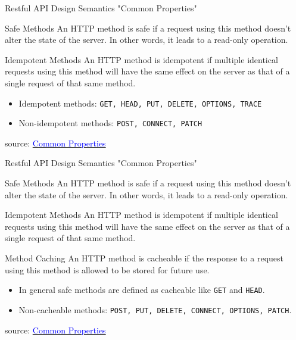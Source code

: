 \documentclass{beamer}
\newcommand{\code}[1]{\colorbox{codegray}{\texttt{#1}}}
\begin{document}
\begin{frame}[t]{Restful API Design Semantics "Common Properties"}
	\scriptsize
	\begin{block}{Safe Methods}	
		An HTTP method is safe if a request using this method doesn’t alter the state of the server. In other words, it leads to a read-only operation.
	\end{block}
		
	\begin{block}{Idempotent Methods}
		An HTTP method is idempotent if multiple identical requests using this method will have the same effect on the server as that of a single request of that same method.\\
		\begin{itemize}
			\item Idempotent methods: \code{GET, HEAD, PUT, DELETE, OPTIONS, TRACE}
			\item Non-idempotent methods: \code{POST, CONNECT, PATCH}
		\end{itemize}	
	\end{block}
	
	\vspace{27mm}
	\tiny source: \href{https://learning.mlytics.com/the-internet/http-request-methods} {\textcolor{blue}{Common Properties}} 
\end{frame}

\begin{frame}[t]{Restful API Design Semantics "Common Properties"}
	\scriptsize
	\begin{block}{Safe Methods}		
		An HTTP method is safe if a request using this method doesn’t alter the state of the server. In other words, it leads to a read-only operation.	
	\end{block}
		
	\begin{block}{Idempotent Methods}	
		An HTTP method is idempotent if multiple identical requests using this method will have the same effect on the server as that of a single request of that same method.
	\end{block}
	
	\begin{block}{Method Caching}
		An HTTP method is cacheable if the response to a request using this method is allowed to be stored for future use. 
		\begin{itemize}
			\item In general safe methods are defined as cacheable like \code{GET} and \code{HEAD}.
			\item Non-cacheable methods: \code{POST, PUT, DELETE, CONNECT, OPTIONS, PATCH}.
		\end{itemize}			
		
	\end{block}
	
	\vspace{10mm}
	\tiny source: \href{https://learning.mlytics.com/the-internet/http-request-methods} {\textcolor{blue}{Common Properties}} 
\end{frame}
\end{document}
